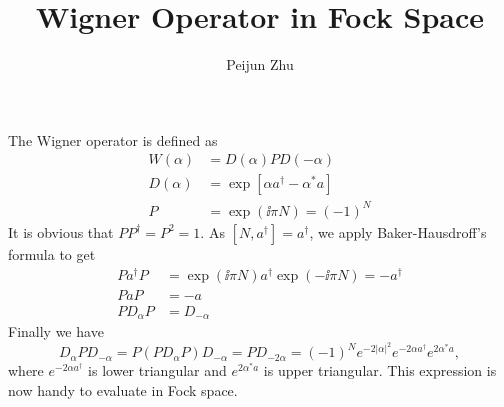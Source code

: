 \documentclass{article}
\begin{document}
\title{Wigner Operator in Fock Space}
\author{Peijun Zhu}
\maketitle

The Wigner operator is defined as
\begin{align}
		W(\alpha)&=D(\alpha)PD(-\alpha)\\
		D(\alpha)&=\exp[\alpha a^\dagger-\alpha^*a]\\
		P&=\exp(\ii\pi N)=(-1)^N
\end{align}
It is obvious that $PP^\dagger=P^2=1$. As $[N, a^\dagger]=a^\dagger$, we apply Baker-Hausdroff's formula to get
\begin{align}
	Pa^\dagger P&=\exp(\ii \pi N) a^\dagger \exp(-\ii \pi N)=-a^\dagger\\
	PaP&=-a\\
	PD_\alpha P&=D_{-\alpha}
\end{align}
Finally we have
$$D_\alpha PD_{-\alpha}=P(PD_\alpha P)D_{-\alpha}=PD_{-2\alpha}=(-1)^Ne^{-2|\alpha|^2}e^{-2\alpha a^\dagger}e^{2\alpha^*a},$$
where $e^{-2\alpha a^\dagger}$ is lower triangular and $e^{2\alpha^*a}$ is upper triangular. This expression is  now handy to evaluate in Fock space.
\end{document}
